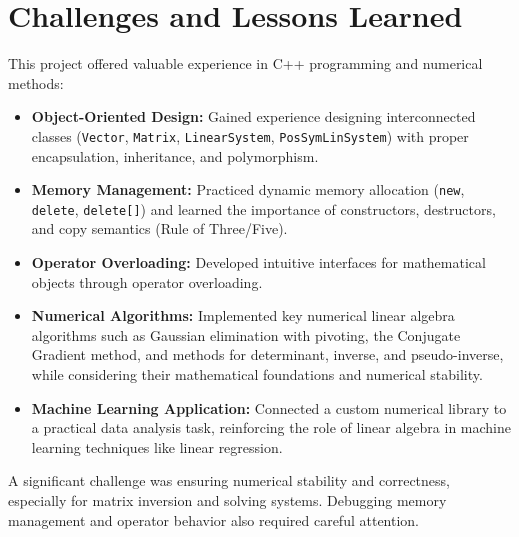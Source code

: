 \section{Challenges and Lessons Learned}
This project offered valuable experience in C++ programming and numerical methods:
\begin{sloppypar}
\begin{itemize}
    \item \textbf{Object-Oriented Design:} Gained experience designing interconnected classes (\texttt{Vector}, \texttt{Matrix}, \texttt{LinearSystem}, \texttt{PosSymLinSystem}) with proper encapsulation, inheritance, and polymorphism.
    \item \textbf{Memory Management:} Practiced dynamic memory allocation (\texttt{new}, \texttt{delete}, \texttt{delete[]}) and learned the importance of constructors, destructors, and copy semantics (Rule of Three/Five).
    \item \textbf{Operator Overloading:} Developed intuitive interfaces for mathematical objects through operator overloading.
    \item \textbf{Numerical Algorithms:} Implemented key numerical linear algebra algorithms such as Gaussian elimination with pivoting, the Conjugate Gradient method, and methods for determinant, inverse, and pseudo-inverse, while considering their mathematical foundations and numerical stability.
    \item \textbf{Machine Learning Application:} Connected a custom numerical library to a practical data analysis task, reinforcing the role of linear algebra in machine learning techniques like linear regression.
\end{itemize}
\end{sloppypar}
A significant challenge was ensuring numerical stability and correctness, especially for matrix inversion and solving systems. Debugging memory management and operator behavior also required careful attention.


